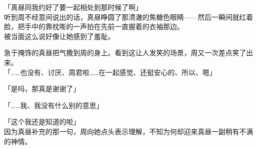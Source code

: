 「真昼同我约好了要一起相处到那时候了啊」\\

听到周不经意间说出的话，真昼睁圆了那清澈的焦糖色眼睛——然后一瞬间就红着脸，把手中的靠枕嘭的一声拍在先前一直握着的衣袖那边。\\

被当面这么说好像让她感到了羞耻。

急于掩饰的真昼把气撒到周的身上。看到这让人发笑的场景，周又一次差点笑了出来。\\

「……也没有、讨厌、周君啦……在一起感觉、还挺安心的、所以、嗯」

「是吗，那真是谢谢了」

「……我、我没有什么别的意思」

「这个我还是知道的啦」\\

因为真昼补充的那一句，周向她点头表示理解，不知为何却迎来真昼一副稍有不满的神情。
